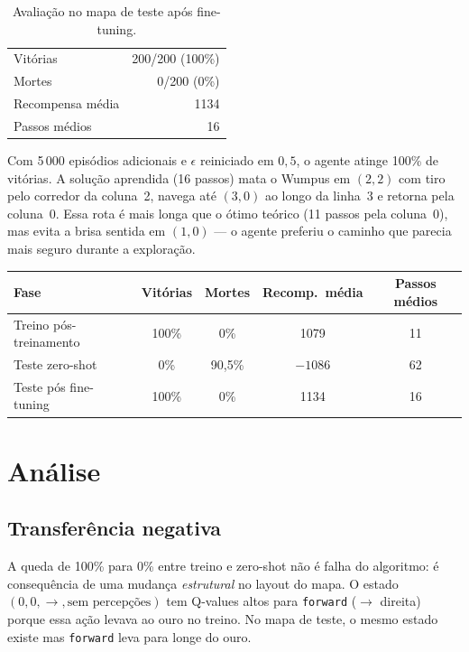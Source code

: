 \documentclass[11pt,a4paper]{article}
\begin{document}
\begin{table}[h]
\centering
\caption{Avalia\c{c}\~ao no mapa de teste ap\'os fine-tuning.}
\begin{tabular}{lr}
\toprule
Vit\'orias & 200/200 (100\%) \\
Mortes     & 0/200 (0\%) \\
Recompensa m\'edia & 1134 \\
Passos m\'edios    & 16 \\
\bottomrule
\end{tabular}
\end{table}

Com 5\,000 epis\'odios adicionais e $\epsilon$ reiniciado em $0{,}5$, o agente atinge 100\% de vit\'orias.
A solu\c{c}\~ao aprendida (16 passos) mata o Wumpus em $(2,2)$ com tiro pelo corredor da
coluna~2, navega at\'e $(3,0)$ ao longo da linha~3 e retorna pela coluna~0. Essa rota \'e mais
longa que o \'otimo te\'orico (11 passos pela coluna~0), mas evita a brisa sentida em $(1,0)$
--- o agente preferiu o caminho que parecia mais seguro durante a explora\c{c}\~ao.

\begin{table}[h]
\centering
\begin{tabular}{lcccc}
\toprule
Fase & Vit\'orias & Mortes & Recomp.\ m\'edia & Passos m\'edios \\
\midrule
Treino p\'os-treinamento  & 100\% & 0\%   & 1079   & 11 \\
Teste zero-shot           & 0\%   & 90,5\% & $-1086$ & 62 \\
Teste p\'os fine-tuning   & 100\% & 0\%   & 1134   & 16 \\
\bottomrule
\end{tabular}
\end{table}

\section{An\'alise}

\subsection{Transfer\^encia negativa}

A queda de 100\% para 0\% entre treino e zero-shot n\~ao \'e falha do algoritmo: \'e consequ\^encia
de uma mudan\c{c}a \textit{estrutural} no layout do mapa. O estado $(0,0,\to,\text{sem percep\c{c}\~oes})$ tem
Q-values altos para \texttt{forward} ($\to$ direita) porque essa a\c{c}\~ao levava ao ouro no treino. No
mapa de teste, o mesmo estado existe mas \texttt{forward} leva para longe do ouro.
\end{document}
